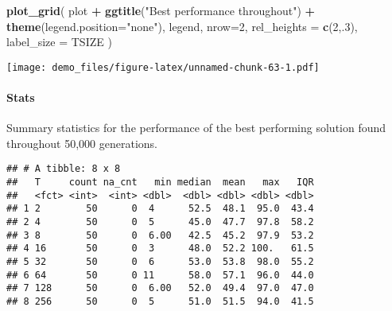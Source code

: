 \documentclass[]{book}
\newenvironment{Shaded}{\begin{snugshade}}{\end{snugshade}}
\newcommand{\DataTypeTok}[1]{\textcolor[rgb]{0.13,0.29,0.53}{#1}}
\newcommand{\DecValTok}[1]{\textcolor[rgb]{0.00,0.00,0.81}{#1}}
\newcommand{\KeywordTok}[1]{\textcolor[rgb]{0.13,0.29,0.53}{\textbf{#1}}}
\newcommand{\NormalTok}[1]{#1}
\newcommand{\OperatorTok}[1]{\textcolor[rgb]{0.81,0.36,0.00}{\textbf{#1}}}
\newcommand{\OtherTok}[1]{\textcolor[rgb]{0.56,0.35,0.01}{#1}}
\newcommand{\StringTok}[1]{\textcolor[rgb]{0.31,0.60,0.02}{#1}}
\let\oldparagraph\paragraph
\renewcommand{\paragraph}[1]{\oldparagraph{#1}\mbox{}}
\begin{document}
\begin{Shaded}
\begin{Highlighting}[]
\KeywordTok{plot_grid}\NormalTok{(}
\NormalTok{  plot }\OperatorTok{+}
\StringTok{    }\KeywordTok{ggtitle}\NormalTok{(}\StringTok{"Best performance throughout"}\NormalTok{) }\OperatorTok{+}
\StringTok{    }\KeywordTok{theme}\NormalTok{(}\DataTypeTok{legend.position=}\StringTok{"none"}\NormalTok{),}
\NormalTok{  legend,}
  \DataTypeTok{nrow=}\DecValTok{2}\NormalTok{,}
  \DataTypeTok{rel_heights =} \KeywordTok{c}\NormalTok{(}\DecValTok{2}\NormalTok{,.}\DecValTok{3}\NormalTok{),}
  \DataTypeTok{label_size =}\NormalTok{ TSIZE}
\NormalTok{)}
\end{Highlighting}
\end{Shaded}

\texttt{[image: demo\_files/figure-latex/unnamed-chunk-63-1.pdf]}

\hypertarget{stats-34}{%
\paragraph{Stats}\label{stats-34}}

Summary statistics for the performance of the best performing solution found throughout 50,000 generations.

\begin{Shaded}
\end{Shaded}

\begin{verbatim}
## # A tibble: 8 x 8
##   T     count na_cnt   min median  mean   max   IQR
##   <fct> <int>  <int> <dbl>  <dbl> <dbl> <dbl> <dbl>
## 1 2        50      0  4      52.5  48.1  95.0  43.4
## 2 4        50      0  5      45.0  47.7  97.8  58.2
## 3 8        50      0  6.00   42.5  45.2  97.9  53.2
## 4 16       50      0  3      48.0  52.2 100.   61.5
## 5 32       50      0  6      53.0  53.8  98.0  55.2
## 6 64       50      0 11      58.0  57.1  96.0  44.0
## 7 128      50      0  6.00   52.0  49.4  97.0  47.0
## 8 256      50      0  5      51.0  51.5  94.0  41.5
\end{verbatim}
\end{document}

